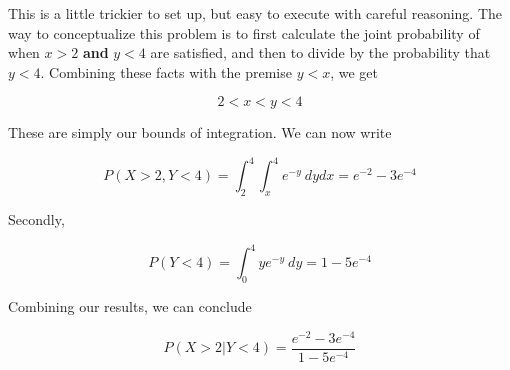 \documentclass[10pt, oneside]{article}
\begin{document}
\begin{enumerate}[label=6.\arabic*]
\begin{enumerate}
	This is a little trickier to set up, but easy to execute with careful reasoning. The way to conceptualize this problem is to first calculate the joint probability of when $x > 2$ \textbf{and} $y < 4$ are satisfied, and then to divide by the probability that $y < 4$. Combining these facts with the premise $y < x$, we get
	
	\[ 2 < x < y < 4 \]
	
	These are simply our bounds of integration. We can now write
	
	\[ P(X > 2, Y < 4) = \int^4_2 \int^4_x e^{-y} \ dy dx = e^{-2} -3e^{-4}  \]
	
	Secondly, 
	
	\[ P(Y < 4) = \int^4_0 y e^{-y} \ dy = 1 - 5 e^{-4} \]
	
	Combining our results, we can conclude
	
	\[ \boxed{ P(X > 2 | Y < 4) = \frac{e^{-2} - 3e^{-4} }{1 - 5e^{-4}} } \]

\end{enumerate}

\end{enumerate}
\end{document}
